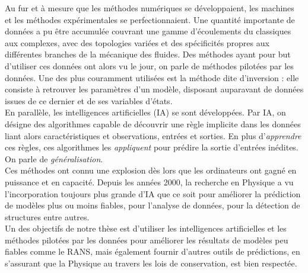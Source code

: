 \documentclass[a4paper,12pt]{article}
\numberwithin{equation}{section} %
\begin{document}
\noindent Au fur et à mesure que les méthodes numériques se développaient, les machines et les méthodes expérimentales se perfectionnaient. Une quantité importante de données a pu être accumulée couvrant une gamme d'écoulements du classiques aux complexes, avec des topologies variées et des spécificités propres aux différentes branches de la mécanique des fluides. Des méthodes ayant pour but d'utiliser ces données ont alors vu le jour, on parle de méthodes pilotées par les données. Une des plus couramment utilisées est la méthode dite d'inversion : elle consiste à retrouver les paramètres d'un modèle, disposant auparavant de données issues de ce dernier et de ses variables d'états. \\

\noindent En parallèle, les intelligences artificielles (IA) se sont développées.
 Par IA, on désigne des algorithmes capable de découvrir une règle implicite dans les données liant alors caractéristiques et observations, entrées et sorties. En plus d'\textit{apprendre} ces règles, ces algorithmes les \textit{appliquent} pour prédire la sortie d'entrées inédites. On parle de \textit{généralisation}.\\
Ces méthodes ont connu une explosion dès lors que les ordinateurs ont gagné en puissance et en capacité. Depuis les années 2000, la recherche en Physique a vu l'incorporation toujours plus grande d'IA que ce soit pour améliorer la prédiction de modèles plus ou moins fiables, pour l'analyse de données, pour la détection de structures entre autres. \\

\noindent Un des objectifs de notre thèse est d'utiliser les intelligences artificielles et les méthodes pilotées par les données pour améliorer les résultats de modèles peu fiables comme le RANS, mais également fournir d'autres outils de prédictions, en s'assurant que la Physique au travers les lois de conservation, est bien respectée.

\end{document}
